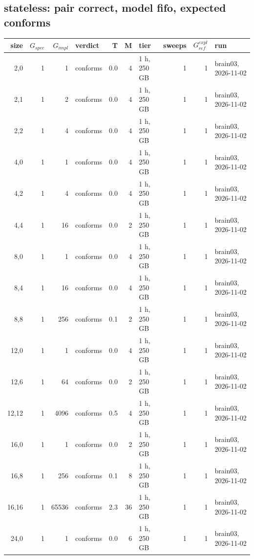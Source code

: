\documentclass[10pt]{article}
\begin{document}
\subsection*{stateless: pair \textsf{correct}, model fifo, expected conforms}
\begin{longtable}{@{}rrrlrrlrrl@{}}
\toprule
size & $G_{\mathit{spec}}$ & $G_{\mathit{impl}}$ & verdict & T & M & tier & sweeps & $G_{\mathit{ref}}^{\mathit{expl}}$ & run \\
\midrule
\endhead
\color{blue} 2,0 & 1 & 1 & conforms & 0.0 & 4 & 1 h, 250 GB & 1 & 1 & brain03, 2026-11-02 \\
\color{blue} 2,1 & 1 & 2 & conforms & 0.0 & 4 & 1 h, 250 GB & 1 & 1 & brain03, 2026-11-02 \\
\color{blue} 2,2 & 1 & 4 & conforms & 0.0 & 4 & 1 h, 250 GB & 1 & 1 & brain03, 2026-11-02 \\
\color{blue} 4,0 & 1 & 1 & conforms & 0.0 & 4 & 1 h, 250 GB & 1 & 1 & brain03, 2026-11-02 \\
\color{blue} 4,2 & 1 & 4 & conforms & 0.0 & 4 & 1 h, 250 GB & 1 & 1 & brain03, 2026-11-02 \\
\color{blue} 4,4 & 1 & 16 & conforms & 0.0 & 2 & 1 h, 250 GB & 1 & 1 & brain03, 2026-11-02 \\
\color{blue} 8,0 & 1 & 1 & conforms & 0.0 & 4 & 1 h, 250 GB & 1 & 1 & brain03, 2026-11-02 \\
\color{blue} 8,4 & 1 & 16 & conforms & 0.0 & 4 & 1 h, 250 GB & 1 & 1 & brain03, 2026-11-02 \\
\color{blue} 8,8 & 1 & 256 & conforms & 0.1 & 2 & 1 h, 250 GB & 1 & 1 & brain03, 2026-11-02 \\
\color{blue} 12,0 & 1 & 1 & conforms & 0.0 & 4 & 1 h, 250 GB & 1 & 1 & brain03, 2026-11-02 \\
\color{blue} 12,6 & 1 & 64 & conforms & 0.0 & 2 & 1 h, 250 GB & 1 & 1 & brain03, 2026-11-02 \\
\color{blue} 12,12 & 1 & 4096 & conforms & 0.5 & 4 & 1 h, 250 GB & 1 & 1 & brain03, 2026-11-02 \\
\color{blue} 16,0 & 1 & 1 & conforms & 0.0 & 2 & 1 h, 250 GB & 1 & 1 & brain03, 2026-11-02 \\
\color{blue} 16,8 & 1 & 256 & conforms & 0.1 & 8 & 1 h, 250 GB & 1 & 1 & brain03, 2026-11-02 \\
\color{blue} 16,16 & 1 & 65536 & conforms & 2.3 & 36 & 1 h, 250 GB & 1 & 1 & brain03, 2026-11-02 \\
\color{blue} 24,0 & 1 & 1 & conforms & 0.0 & 6 & 1 h, 250 GB & 1 & 1 & brain03, 2026-11-02 \\

\end{longtable}
\end{document}
